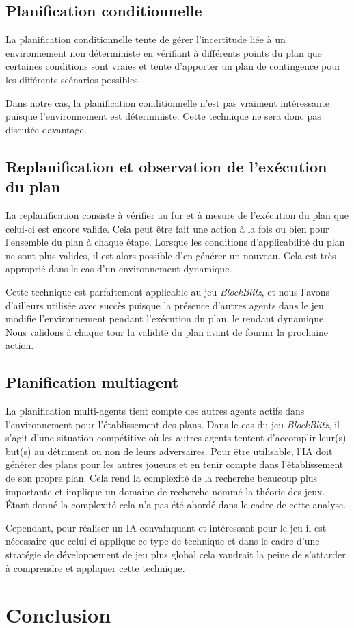 \documentclass[12pt,english,frenchb,letterpaper]{article}
\begin{document}
\subsection{Planification conditionnelle}
La planification conditionnelle tente de gérer l'incertitude liée à un environnement non déterministe en vérifiant à différents points du plan que certaines conditions sont vraies et tente d'apporter un plan de contingence pour les différents scénarios possibles.

Dans notre cas, la planification conditionnelle n'est pas vraiment intéressante puisque l'environnement est déterministe.  Cette technique ne sera donc pas discutée davantage.

\subsection{Replanification et observation de l'exécution du plan}
La replanification consiste à vérifier au fur et à mesure de l'exécution du plan que celui-ci est encore valide.  Cela peut être fait une action à la fois ou bien pour l'ensemble du plan à chaque étape.  Lorsque les conditions d'applicabilité du plan ne sont plus valides, il est alors possible d'en générer un nouveau. Cela est très approprié dans le cas d'un environnement dynamique.

Cette technique est parfaitement applicable au jeu \textit{BlockBlitz}, et nous l'avons d'ailleurs utilisée avec succès puisque la présence d'autres agents dans le jeu modifie l'environnement pendant l'exécution du plan, le rendant dynamique.  Nous validons à chaque tour la validité du plan avant de fournir la prochaine action.

\subsection{Planification multiagent}

La planification multi-agents tient compte des autres agents actifs dans l'environnement pour l'établissement des plans.  Dans le cas du jeu \textit{BlockBlitz}, il s'agit d'une situation compétitive où les autres agents tentent d'accomplir leur(s) but(s) au détriment ou non de leurs adversaires.  Pour être utilisable, l'IA doit générer des plans pour les autres joueurs et en tenir compte dans l'établissement de son propre plan.  Cela rend la complexité de la recherche beaucoup plus importante et implique un domaine de recherche nommé la théorie des jeux.  Étant donné la complexité cela n'a pas été abordé dans le cadre de cette analyse.  

Cependant, pour réaliser un IA convainquant et intéressant pour le jeu il est nécessaire que celui-ci applique ce type de technique et dans le cadre d'une stratégie de développement de jeu plus global cela vaudrait la peine de s'attarder à comprendre et appliquer cette technique.


\section{Conclusion}
\end{document}
